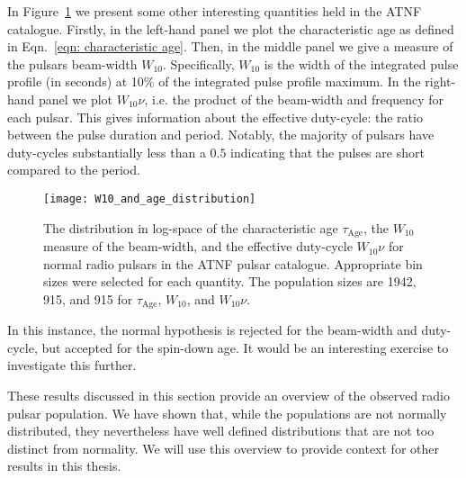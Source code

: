 In Figure~\ref{fig: pop stats others} we present some other interesting quantities
held in the ATNF catalogue. Firstly, in the left-hand panel we plot the characteristic
age as defined in Eqn.~\eqref{eqn: characteristic age}. Then, in the middle panel
we give a measure of the pulsars beam-width $W_{10}$. Specifically, $W_{10}$ is
the width of the integrated pulse profile (in seconds) at 10\% of the integrated
pulse profile maximum. In the right-hand panel we  plot $W_{10}\nu$, i.e. the
product of the beam-width and frequency for each pulsar. This gives information
about the effective duty-cycle: the ratio between the pulse duration and period.
Notably, the majority of pulsars have duty-cycles substantially less than a
$0.5$ indicating that the pulses are short compared to the period.
\begin{figure}[htb]
\centering
\texttt{[image: W10\_and\_age\_distribution]}
\caption{The distribution in log-space of the characteristic age
$\tau_{\textrm{Age}}$, the $W_{10}$ measure of the beam-width, and the
effective duty-cycle $W_{10} \nu$ for normal radio pulsars in the
ATNF pulsar catalogue. Appropriate bin sizes were selected for each quantity.
The population sizes are 1942, 915, and 915 for
$\tau_{\textrm{Age}}$, $W_{10}$, and $W_{10}\nu$.}
\label{fig: pop stats others}
\end{figure}
In this instance, the normal hypothesis is rejected for the beam-width and
duty-cycle, but accepted for the spin-down age. It would be an interesting
exercise to investigate this further.

These results discussed in this section provide an overview
of the observed radio pulsar population. We have shown that, while the populations
are not normally distributed, they nevertheless have well defined distributions
that are not too distinct from normality. We will use this overview to provide
context for other results in this thesis.

